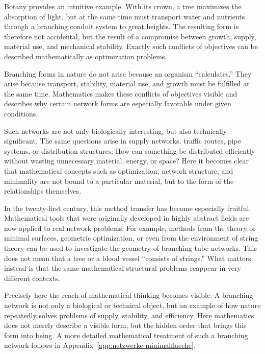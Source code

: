 Botany provides an intuitive example.
With its crown, a tree maximizes the absorption of light,
but at the same time must transport water and nutrients through a branching conduit system
to great heights.
The resulting form is therefore not accidental,
but the result of a compromise between growth,
supply,
material use,
and mechanical stability.
Exactly such conflicts of objectives can be described mathematically as optimization problems.

\begin{DidacticBox}
		\label{box:branching-network}
	Branching forms in nature do not arise
	because an organism ``calculates.''
	They arise
	because transport,
	stability,
	material use,
	and growth must be fulfilled at the same time.
	Mathematics makes these conflicts of objectives visible
	and describes
	why certain network forms are especially favorable under given conditions.
\end{DidacticBox}

Such networks are not only biologically interesting,
but also technically significant.
The same questions arise in supply networks,
traffic routes,
pipe systems,
or distribution structures:
How can something be distributed efficiently
without wasting unnecessary material,
energy,
or space?
Here it becomes clear
that mathematical concepts such as optimization,
network structure,
and minimality are not bound to a particular material,
but to the form of the relationships themselves.

In the twenty-first century, this method transfer has become especially fruitful.
Mathematical tools
that were originally developed in highly abstract fields
are now applied to real network problems.
For example, methods from the theory of minimal surfaces,
geometric optimization,
or even from the environment of string theory
can be used
to investigate the geometry of branching tube networks.
This does not mean
that a tree or a blood vessel ``consists of strings.''
What matters instead
is that the same mathematical structural problems reappear
in very different contexts.

Precisely here the reach of mathematical thinking becomes visible.
A branching network is not only a biological or technical object,
but an example of how nature repeatedly solves problems of supply,
stability,
and efficiency.
Here mathematics does not merely describe a visible form,
but the hidden order
that brings this form into being.
A more detailed mathematical treatment of such a branching network
follows in Appendix~\ref{app:netzwerke-minimalflaeche}.

